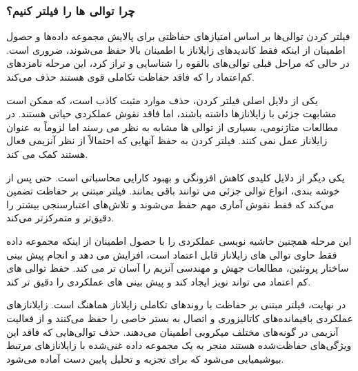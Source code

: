             \subsubsection*{چرا توالی ها را فیلتر کنیم؟}
                فیلتر کردن توالی‌ها بر اساس امتیازهای حفاظتی برای پالایش مجموعه داده‌ها و حصول اطمینان از اینکه فقط کاندیدهای زایلاناز با اطمینان بالا حفظ می‌شوند، ضروری است. در حالی که مراحل قبلی توالی‌های بالقوه را شناسایی و تراز کرد، این مرحله نامزدهای کم‌اعتماد را که فاقد حفاظت تکاملی قوی هستند حذف می‌کند.

                یکی از دلایل اصلی فیلتر کردن، حذف موارد مثبت کاذب است، که ممکن است مشابهت جزئی با زایلانازها داشته باشند، اما فاقد نقوش عملکردی حیاتی هستند. در مطالعات متاژنومی، بسیاری از توالی ها مشابه به نظر می رسند اما لزوماً به عنوان زایلاناز عمل نمی کنند. فیلتر کردن به حفظ آنهایی که احتمالاً از نظر آنزیمی فعال هستند کمک می کند.

                یکی دیگر از دلایل کلیدی کاهش افزونگی و بهبود کارایی محاسباتی است. حتی پس از خوشه بندی، انواع توالی جزئی می توانند باقی بمانند. فیلتر مبتنی بر حفاظت تضمین می‌کند که فقط نقوش آماری مهم حفظ می‌شوند و تلاش‌های اعتبارسنجی بیشتر را دقیق‌تر و متمرکزتر می‌کند.

                این مرحله همچنین حاشیه نویسی عملکردی را با حصول اطمینان از اینکه مجموعه داده فقط حاوی توالی های زایلاناز قابل اعتماد است، افزایش می دهد و انجام پیش بینی ساختار پروتئین، مطالعات جهش و مهندسی آنزیم را آسان تر می کند. حفظ توالی های کم اعتماد می تواند نویز ایجاد کند و پیش بینی های عملکردی را دقیق تر کند.

                در نهایت، فیلتر مبتنی بر حفاظت با روندهای تکاملی زایلاناز هماهنگ است. زایلانازهای عملکردی باقیمانده‌های کاتالیزوری و اتصال به بستر خاصی را حفظ می‌کنند و از فعالیت آنزیمی در گونه‌های مختلف میکروبی اطمینان می‌دهند. حذف توالی‌هایی که فاقد این ویژگی‌های حفاظت‌شده هستند منجر به یک مجموعه داده غنی‌شده با زایلانازهای مرتبط بیوشیمیایی می‌شود که برای تجزیه و تحلیل پایین دست آماده می‌شود.

